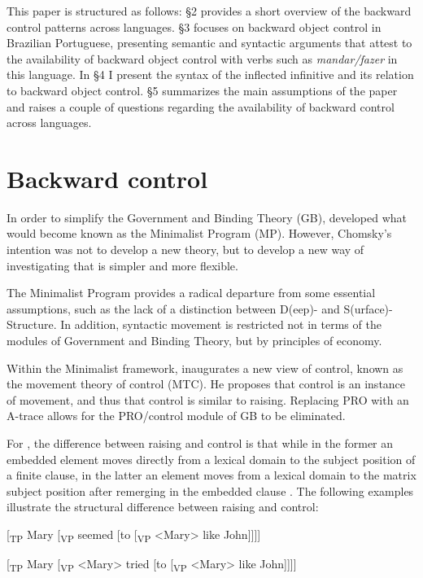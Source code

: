 \documentclass[output=paper]{langsci/langscibook}
\begin{document}
This paper is structured as follows: §2 provides a short overview of the backward control patterns across languages. §3 focuses on backward object control in Brazilian Portuguese, presenting semantic and syntactic arguments that attest to the availability of backward object control with verbs such as \textit{mandar/fazer} in this language. In §4 I present the syntax of the inflected infinitive and its relation to backward object control. §5 summarizes the main assumptions of the paper and raises a couple of questions regarding the availability of backward control across languages.

\section{Backward control}%

In order to simplify the Government and Binding Theory (GB), \citet{Chomsky1993} developed what would become known as the Minimalist Program (MP). However, Chomsky’s intention was not to develop a new theory, but to develop a new way of investigating that is simpler and more flexible.

The Minimalist Program provides a radical departure from some essential assumptions, such as the lack of a distinction between D(eep)- and S(urface)-Structure. In addition, syntactic movement is restricted not in terms of the modules of Government and Binding Theory, but by principles of economy. 

Within the Minimalist framework, \citet{Hornstein1999,Hornstein2001} inaugurates a new view of control, known as the movement theory of control (MTC). He proposes that control is an instance of movement, and thus that control is similar to raising. Replacing PRO with an A-trace allows for the PRO/control module of GB to be eliminated.

For \citet{Hornstein1999}, the difference between raising and control is that while in the former an embedded element moves directly from a lexical domain to the subject position of a finite clause, in the latter an element moves from a lexical domain to the matrix subject position after remerging in the embedded clause \citep{Boeckx2006}. The following examples illustrate the structural difference between raising and control:

\ea%
    \label{ex:moreno:3}
[\textsubscript{TP} Mary [\textsubscript{VP} seemed [to [\textsubscript{VP} <Mary> like John]]]]
\z

\ea%
\label{ex:moreno:4}
[\textsubscript{TP} Mary [\textsubscript{VP} <Mary> tried [to [\textsubscript{VP} <Mary> like John]]]]
\z
\end{document}
